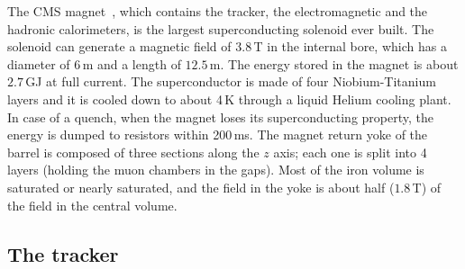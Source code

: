 The CMS magnet~\cite{CMSmagnet}, which contains the tracker, the electromagnetic and the hadronic calorimeters, is the largest superconducting solenoid ever built. The solenoid can generate a magnetic field of $3.8$\,T in the internal bore, which has a diameter of 6\,m and a length of $12.5$\,m. The energy stored in the magnet is about $2.7$\,GJ at full current. The superconductor is made of four Niobium-Titanium layers and it is cooled down to about 4\,K through a liquid Helium cooling plant. In case of a quench, when the magnet loses its superconducting property, the energy is dumped to resistors within 200\,ms. The magnet return yoke of the barrel is composed of three sections along the $z$ axis; each one is split into 4 layers (holding the muon chambers in the gaps). Most of the iron volume is saturated or nearly saturated, and the field in the yoke is about half ($1.8$\,T) of the field in the central volume.

\subsection{The tracker}

